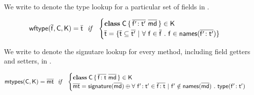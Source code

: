 \documentclass[a4paper,USenglish]{tex/lipics-v2016}
\begin{document}
\begin{mathpar}



\end{mathpar}
\\


We write \wftype{\b\f}\C\K to denote the type lookup for a particular set of fields in \C.

\begin{equation*}
\wftype{\b\f}\C\K = \b\t ~~\mathit{if}~~ \begin{cases}

 \Class \C {\b{\Ftype\fp\tp}}{\b\md} \in \K\\
 \b\t = \{ \b\t \subseteq \b\tp ~|~ \forall~ \f \in \b\f ~.~ \f \in \names{\b{\Ftype\fp\tp}} \} \\
 
\end{cases}
\end{equation*}


We write \classoff\C\K to denote the signutare lookup for every method, including field getters and setters, in \C.

\begin{equation*}
\classoff\C\K = \b\mt ~~\mathit{if}~~ \begin{cases}

 \Class \C {\b{\Ftype\f\t}}{\b\md} \in \K\\
 \b\mt = \sign{\b\md} \oplus \forall ~\Ftype\fp\tp \in \b{\Ftype\f\t} ~|~ \fp \notin \names{\b\md} ~.~ \typez{\Ftype\fp\tp}

\end{cases}
\end{equation*}

\hrulefill

\begin{mathpar}
\end{mathpar}
\end{document}
